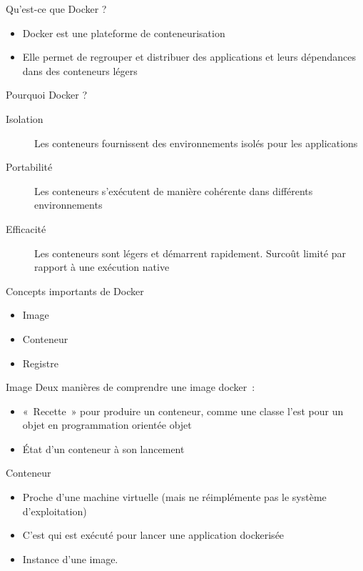 \begin{frame}{Qu'est-ce que Docker ?}
  \begin{itemize}
    \item Docker est une plateforme de conteneurisation
    \item Elle permet de regrouper et distribuer des applications et leurs dépendances dans des conteneurs légers
  \end{itemize}
\end{frame}

\begin{frame}{Pourquoi Docker ?}
  \begin{description}
    \item[Isolation] Les conteneurs fournissent des environnements isolés pour les applications
    \item[Portabilité] Les conteneurs s'exécutent de manière cohérente dans différents environnements
    \item[Efficacité] Les conteneurs sont légers et démarrent rapidement. Surcoût limité par rapport à une exécution native
  \end{description}
\end{frame}

\begin{frame}{Concepts importants de Docker}
  \begin{itemize}
    \item Image
    \item Conteneur
    \item Registre
  \end{itemize}
\end{frame}

\begin{frame}{Image}
  Deux manières de comprendre une image docker~:
  \begin{itemize}
    \item « Recette » pour produire un conteneur, comme une classe l'est pour un objet en programmation orientée objet
    \item État d'un conteneur à son lancement
  \end{itemize}
\end{frame}

\begin{frame}{Conteneur}
  \begin{itemize}
    \item Proche d'une machine virtuelle (mais ne réimplémente pas le système d'exploitation)
    \item C'est qui est exécuté pour lancer une application dockerisée
    \item Instance d'une image.
  \end{itemize}
\end{frame}

